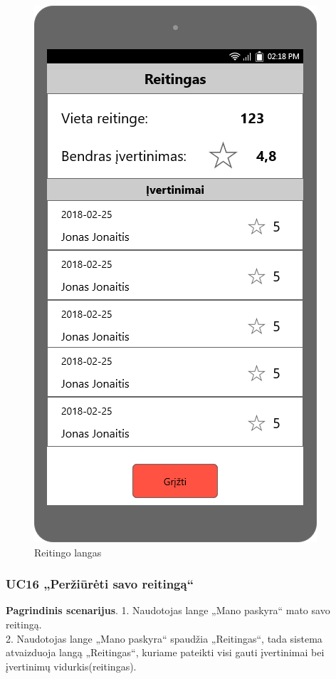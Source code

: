 \documentclass{VUMIFPSbakalaurinis}
\begin{document}
\begin{figure}[H]
	\centering
	\includegraphics[scale=0.4]{img/ScreenShots/Mano_profilis/06-Reitingas}
	\caption{Reitingo langas}
	\label{img:rating}
\end{figure}
\subsubsection{UC16 „Peržiūrėti savo reitingą“}
\textbf{Pagrindinis scenarijus}. 1. Naudotojas lange „Mano paskyra“ mato savo reitingą. \\
2. Naudotojas lange „Mano paskyra“ spaudžia „Reitingas“, tada sistema atvaizduoja langą „Reitingas“, kuriame pateikti visi gauti įvertinimai bei įvertinimų vidurkis(reitingas).
\end{document}
